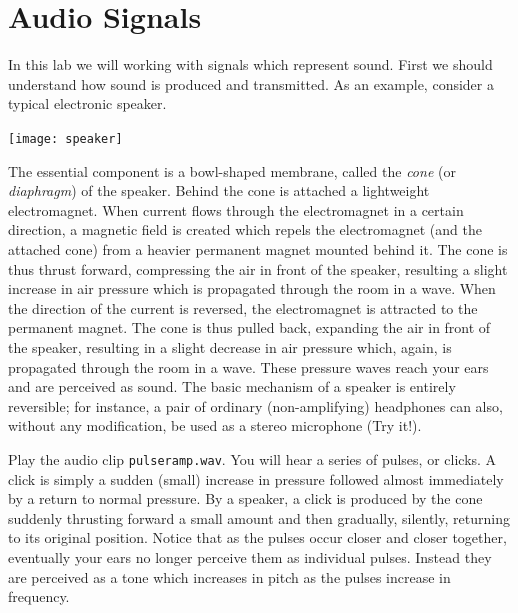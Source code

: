 \def\x{{\bf x}}
\def\q{{\bf q}}
\def\p{{\bf p}}
\def\v{{\bf v}}


\section*{Audio Signals}

In this lab we will working with signals which represent sound. First we should understand how sound is produced and transmitted. As an example, consider a typical electronic speaker.

\begin{center}\texttt{[image: speaker]}\end{center}

The essential component is a bowl-shaped membrane, called the \emph{cone} (or \emph{diaphragm}) of the speaker. Behind the cone is attached a lightweight electromagnet. When current flows through the electromagnet in a certain direction, a magnetic field is created which repels the electromagnet (and the attached cone) from a  heavier permanent magnet mounted behind it. The cone is thus thrust forward, compressing the air in front of the speaker, resulting a slight increase in air pressure which is propagated through the room in a wave. When the direction of the current is reversed, the electromagnet is attracted to the permanent magnet. The cone is thus pulled back, expanding the air in front of the speaker, resulting in a slight decrease in air pressure which, again, is propagated through the room in a wave. These pressure waves reach your ears and are perceived as sound. The basic mechanism of a speaker is entirely reversible; for instance, a pair of ordinary (non-amplifying) headphones can also, without any modification, be used as a stereo microphone (Try it!).

Play the audio clip \texttt{pulseramp.wav}. You will hear a series of pulses, or clicks. A click is simply a sudden (small) increase in pressure followed almost immediately by a return to normal pressure. By a speaker, a click is produced by the cone suddenly thrusting forward a small amount and then gradually, silently, returning to its original position. Notice that as the pulses occur closer and closer together, eventually your ears no longer perceive them as individual pulses. Instead they are perceived as a tone which increases in pitch as the pulses increase in frequency.

